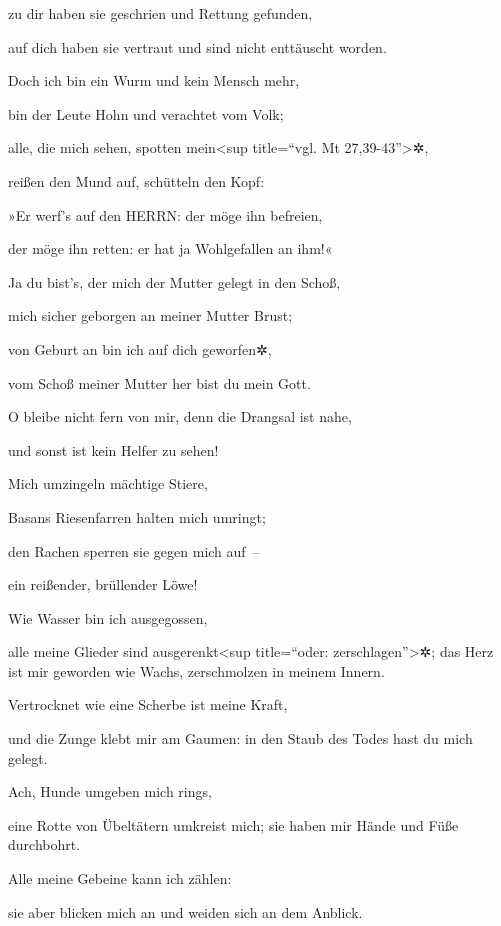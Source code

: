 zu dir haben sie geschrien und Rettung gefunden,

auf dich haben sie vertraut und sind nicht enttäuscht worden.

Doch ich bin ein Wurm und kein Mensch mehr,

bin der Leute Hohn und verachtet vom Volk;

alle, die mich sehen, spotten mein\textless sup
title=``vgl. Mt 27,39-43''\textgreater✲,

reißen den Mund auf, schütteln den Kopf:

»Er werf's auf den HERRN: der möge ihn befreien,

der möge ihn retten: er hat ja Wohlgefallen an ihm!«

Ja du bist's, der mich der Mutter gelegt in den Schoß,

mich sicher geborgen an meiner Mutter Brust;

von Geburt an bin ich auf dich geworfen✲,

vom Schoß meiner Mutter her bist du mein Gott.

O bleibe nicht fern von mir, denn die Drangsal ist nahe,

und sonst ist kein Helfer zu sehen!

Mich umzingeln mächtige Stiere,

Basans Riesenfarren halten mich umringt;

den Rachen sperren sie gegen mich auf~--

ein reißender, brüllender Löwe!

Wie Wasser bin ich ausgegossen,

alle meine Glieder sind ausgerenkt\textless sup title=``oder:
zerschlagen''\textgreater✲; das Herz ist mir geworden wie Wachs,
zerschmolzen in meinem Innern.

Vertrocknet wie eine Scherbe ist meine Kraft,

und die Zunge klebt mir am Gaumen: in den Staub des Todes hast du mich
gelegt.

Ach, Hunde umgeben mich rings,

eine Rotte von Übeltätern umkreist mich; sie haben mir Hände und Füße
durchbohrt.

Alle meine Gebeine kann ich zählen:

sie aber blicken mich an und weiden sich an dem Anblick.

